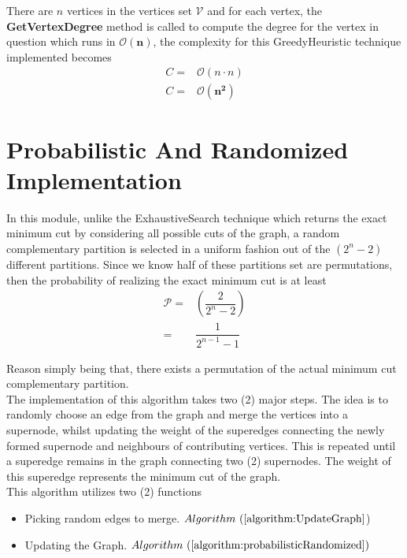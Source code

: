 \documentclass[longpaper, english, final, times]{revdetua}
\begin{document}
			There are $n$ vertices in the vertices set $\mathcal{V}$ and for each vertex, the \textbf{GetVertexDegree} method is called to compute the degree for the vertex in question which runs in $\mathbf{\mathcal{O}(n)}$, the complexity for this GreedyHeuristic technique implemented becomes
			\begin{align*}
				C =& \mathcal{O}(n\cdot n) \\
				C =& \mathbf{\mathcal{O}(n^2)}
			\end{align*}
	
	
	\section{Probabilistic And Randomized Implementation}
		In this module, unlike the ExhaustiveSearch technique which returns the exact minimum cut by considering all possible cuts of the graph, a random complementary partition is selected in a uniform fashion out of the $(2^n-2)$ different partitions. Since we know half of these partitions set are permutations, then the probability of realizing the exact minimum cut is at least 
		\begin{align*}
			\mathcal{P}=&\left(\dfrac{2}{2^n-2}\right) \\
			=&\dfrac{1}{2^{n-1}-1}
		\end{align*}
		 
		Reason simply being that, there exists a permutation of the actual minimum cut complementary partition.\\
		
		The implementation of this algorithm takes two (2) major steps. The idea is to randomly choose an edge from the graph and merge the vertices into a supernode, whilst updating the weight of the superedges connecting the newly formed supernode and neighbours of contributing vertices. This is repeated until a superedge remains in the graph connecting two (2) supernodes. The weight of this superedge represents the minimum cut of the graph.\\
		
		This algorithm utilizes two (2) functions
		\begin{itemize}
			\item Picking random edges to merge. $Algorithm\text{ }(\ref{algorithm:UpdateGraph}$)
			\item Updating the Graph. $Algorithm \text{ }(\ref{algorithm:probabilisticRandomized})$
		\end{itemize}
	
		
\end{document}
